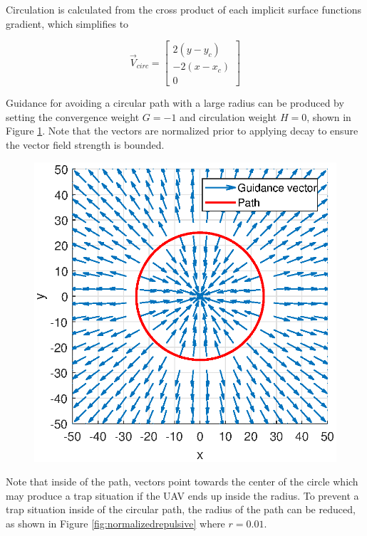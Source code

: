 \documentclass[conf]{new-aiaa}
\begin{document}
Circulation is calculated from the cross product of each implicit surface functions gradient, which simplifies to

\begin{equation}\label{eq:vcirc_circle}
\overrightarrow{V}_{circ} =  \begin{bmatrix}  2(y-y_c) \\[6pt] -2(x-x_c) \\[6pt] 0\end{bmatrix}
\end{equation}

Guidance for avoiding a circular path with a large radius can be produced by setting the convergence weight $G=-1$ and circulation weight $H=0$, shown in Figure \ref{fig:largerepulsive}. Note that the vectors are normalized prior to applying decay to ensure the vector field strength is bounded.

\begin{figure}[H]
	\centering
	\includegraphics[width=0.7\linewidth]{Figures/methods/largeRepulsive}
	\caption{}
	\label{fig:largerepulsive}
\end{figure}

Note that inside of the path, vectors point towards the center of the circle which may produce a trap situation if the UAV ends up inside the radius. To prevent a trap situation inside of the circular path, the radius of the path can be reduced, as shown in Figure \ref{fig:normalizedrepulsive} where $r=0.01$.
\end{document}
